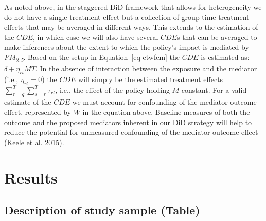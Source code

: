 \documentclass[
  letterpaper,
  DIV=11,
  numbers=noendperiod]{scrartcl}
\begin{document}
As noted above, in the staggered DiD framework that allows for
heterogeneity we do not have a single treatment effect but a collection
of group-time treatment effects that may be averaged in different ways.
This extends to the estimation of the \(CDE\), in which case we will
also have several \(CDE\)s that can be averaged to make inferences about
the extent to which the policy's impact is mediated by
\emph{PM\textsubscript{2.5}}. Based on the setup in
Equation~\ref{eq-etwfem} the \(CDE\) is estimated as:
\(\delta + \eta_{rt}MT\). In the absence of interaction between the
exposure and the mediator (i.e., \(\eta_{rt}=0\)) the \(CDE\) will
simply be the estimated treatment effects
\(\sum_{r=q}^{T} \sum_{s=r}^{T} \tau_{rt}\), i.e., the effect of the
policy holding \(M\) constant. For a valid estimate of the \(CDE\) we
must account for confounding of the mediator-outcome effect, represented
by \(W\) in the equation above. Baseline measures of both the outcome
and the proposed mediators inherent in our DiD strategy will help to
reduce the potential for unmeasured confounding of the mediator-outcome
effect (Keele et al. 2015).

\section{Results}\label{results-1}

\subsection{Description of study sample
(Table)}\label{description-of-study-sample-table}
\end{document}
